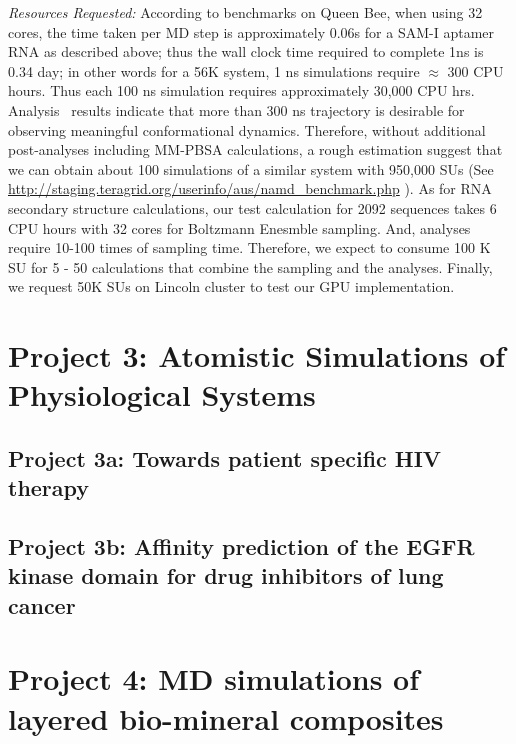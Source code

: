 \documentclass[a4paper,10pt]{article}
\newcommand{\up}{\vspace*{-1em}}
\begin{document}
{\it Resources Requested: } According to benchmarks on Queen Bee, when using 32 cores, the time taken per MD step is approximately 0.06s for a SAM-I aptamer RNA as described above; thus the wall clock time required to complete 1ns is 0.34 day; in other words for a 56K system, 1 ns simulations require $\approx$ 300 CPU hours.  Thus each 100 ns simulation requires approximately 30,000 CPU hrs.  Analysis~\cite{SAM-I-NAR2009} results indicate that more than 300 ns trajectory is desirable for observing meaningful conformational dynamics. Therefore, without additional post-analyses including MM-PBSA calculations, a rough estimation suggest that we can obtain about 100 simulations of a similar system with 950,000 SUs (See {\url{http://staging.teragrid.org/userinfo/aus/namd_benchmark.php}} ).  As for RNA secondary structure calculations, our test calculation for 2092 sequences takes 6 CPU hours with 32 cores for Boltzmann Enesmble sampling.  And, analyses require 10-100 times of sampling time.  Therefore, we expect to consume 100 K SU for 5 - 50 calculations that combine the sampling and the analyses.  Finally, we request 50K SUs on Lincoln cluster to test our GPU implementation.

\section*{Project 3: Atomistic Simulations of Physiological Systems}

\subsection*{Project 3a: Towards patient specific HIV therapy}


\subsection*{Project 3b: Affinity prediction of the EGFR kinase domain for drug inhibitors of lung cancer}


\up\up
\section*{Project 4: MD simulations of layered bio-mineral composites}
 
\up
\end{document}
